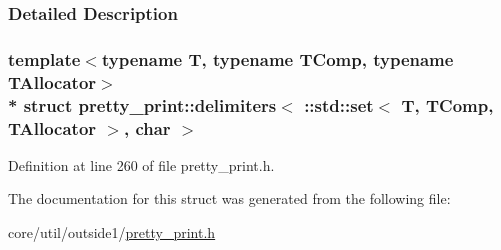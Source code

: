 \subsubsection{Detailed Description}
\subsubsection*{template$<$typename T, typename T\+Comp, typename T\+Allocator$>$\\*
struct pretty\+\_\+print\+::delimiters$<$ \+::std\+::set$<$ T, T\+Comp, T\+Allocator $>$, char $>$}



Definition at line 260 of file pretty\+\_\+print.\+h.



The documentation for this struct was generated from the following file\+:\begin{DoxyCompactItemize}
\item 
core/util/outside1/\hyperlink{pretty__print_8h}{pretty\+\_\+print.\+h}\end{DoxyCompactItemize}
